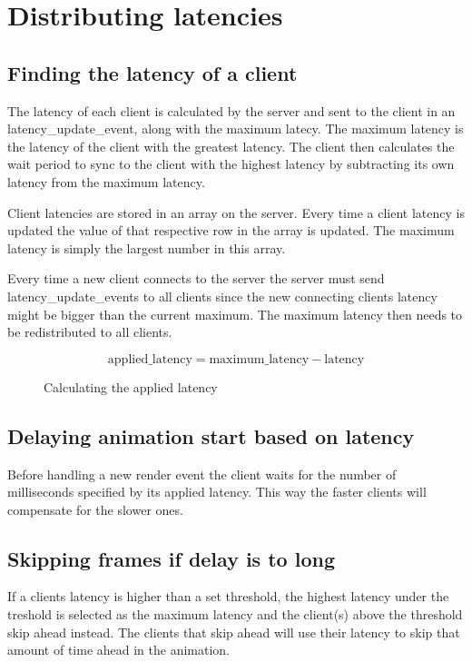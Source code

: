 \section{Distributing latencies}

\subsection{Finding the latency of a client}
The latency of each client is calculated by the server and sent to the client in an latency\_update\_event, along with the maximum latecy. The maximum latency is the latency of the client with the greatest latency. The client then calculates the wait period to sync to the client with the highest latency by subtracting its own latency from the maximum latency.

Client latencies are stored in an array on the server. Every time a client latency is updated the value of that respective row in the array is updated. The maximum latency is simply the largest number in this array.

Every time a new client connects to the server the server must send latency\_update\_events to all clients since the new connecting clients latency might be bigger than the current maximum. The maximum latency then needs to be redistributed to all clients. 

\begin{figure}[h!]
	\begin{displaymath}
		\text{applied\_latency} = \text{maximum\_latency} - \text{latency}
	\end{displaymath}
	\caption{Calculating the applied latency}
	\label{fig:applatency}
\end{figure} 

\subsection{Delaying animation start based on latency}
Before handling a new render event the client waits for the number of milliseconds specified by its applied latency. This way the faster clients will compensate for the slower ones. 

\subsection{Skipping frames if delay is to long}
If a clients latency is higher than a set threshold, the highest latency under the treshold is selected as the maximum latency and the client(s) above the threshold skip ahead instead. The clients that skip ahead will use their latency to skip that amount of time ahead in the animation. 


